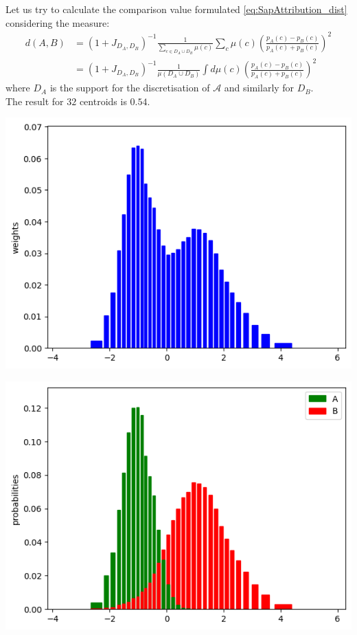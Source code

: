 \begin{exempli_gratia}
\begin{modified}
	\noindent Let us try to calculate the comparison value formulated \cref{eq:SapAttribution_dist} considering the measure:
	\begin{align*}
		d(A,B)&=(1+J_{D_A,D_B})^{-1}\frac{1}{\sum_{c\in D_A\cup D_B}\mu(c)}\sum_c \mu(c)\left(\frac{p_A(c)-p_B(c)}{p_A(c)+p_B(c)}\right)^2 \\
		&= (1+J_{D_A,D_B})^{-1}\frac{1}{\mu(D_A\cup D_B)}\int d\mu(c) \left(\frac{p_A(c)-p_B(c)}{p_A(c)+p_B(c)}\right)^2
	\end{align*}
	where $D_A$ is the support for the discretisation of ${\mathcal{A}}$ and similarly for $D_B$.\\ The result for $32$ centroids is $0.54$.

	\begin{center}
		\begin{minipage}{0.48\textwidth}
			\centering
			\includegraphics[width=\textwidth]{Figures/fused_analysis.png}
		\end{minipage}
		\hfill
		\begin{minipage}{0.48\textwidth}
			\centering
			\includegraphics[width=\textwidth]{Figures/separated_analysis.png}
		\end{minipage}
	\end{center}
	\end{modified}

\end{exempli_gratia}

